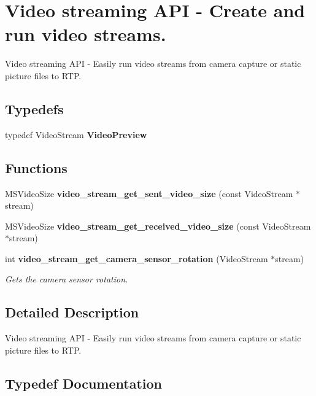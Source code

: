 \section{Video streaming A\-P\-I -\/ Create and run video streams.}
\label{group__video__stream__api}


Video streaming A\-P\-I -\/ Easily run video streams from camera capture or static picture files to R\-T\-P.  


\subsection*{Typedefs}
\begin{DoxyCompactItemize}
\item 
typedef Video\-Stream {\bf Video\-Preview}
\end{DoxyCompactItemize}
\subsection*{Functions}
\begin{DoxyCompactItemize}
\item 
M\-S\-Video\-Size {\bf video\-\_\-stream\-\_\-get\-\_\-sent\-\_\-video\-\_\-size} (const Video\-Stream $\ast$stream)
\item 
M\-S\-Video\-Size {\bf video\-\_\-stream\-\_\-get\-\_\-received\-\_\-video\-\_\-size} (const Video\-Stream $\ast$stream)
\item 
int {\bf video\-\_\-stream\-\_\-get\-\_\-camera\-\_\-sensor\-\_\-rotation} (Video\-Stream $\ast$stream)
\begin{DoxyCompactList}\small\item\em Gets the camera sensor rotation. \end{DoxyCompactList}\end{DoxyCompactItemize}


\subsection{Detailed Description}
Video streaming A\-P\-I -\/ Easily run video streams from camera capture or static picture files to R\-T\-P. 

\subsection{Typedef Documentation}

